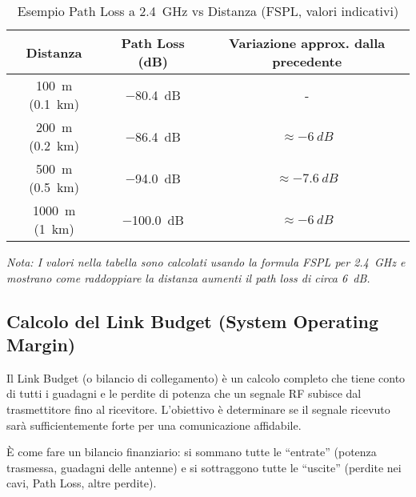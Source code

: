 \begin{table}[H]
\centering
\caption{Esempio Path Loss a \SI{2.4}{\giga\hertz} vs Distanza (FSPL, valori indicativi)}
\begin{tabular}{|c|c|c|}
\hline
\textbf{Distanza} & \textbf{Path Loss (dB)} & \textbf{Variazione approx. dalla precedente} \\ \hline
\SI{100}{\meter} (\SI{0.1}{\kilo\meter}) & \SI{-80.4}{dB} & - \\ \hline %
\SI{200}{\meter} (\SI{0.2}{\kilo\meter}) & \SI{-86.4}{dB} & $\approx \SI{-6}{dB}$ \\ \hline %
\SI{500}{\meter} (\SI{0.5}{\kilo\meter}) & \SI{-94.0}{dB} & $\approx \SI{-7.6}{dB}$ \\ \hline %
\SI{1000}{\meter} (\SI{1}{\kilo\meter}) & \SI{-100.0}{dB} & $\approx \SI{-6}{dB}$ \\ \hline %
\end{tabular}
\label{tab:path_loss_example} %
\end{table}
\textit{Nota: I valori nella tabella sono calcolati usando la formula FSPL per \SI{2.4}{\giga\hertz} e mostrano come raddoppiare la distanza aumenti il path loss di circa \SI{6}{dB}.}


\subsection{Calcolo del Link Budget (System Operating Margin)}
Il Link Budget (o bilancio di collegamento) è un calcolo completo che tiene conto di tutti i guadagni e le perdite di potenza che un segnale RF subisce dal trasmettitore fino al ricevitore. L'obiettivo è determinare se il segnale ricevuto sarà sufficientemente forte per una comunicazione affidabile.

È come fare un bilancio finanziario: si sommano tutte le ``entrate'' (potenza trasmessa, guadagni delle antenne) e si sottraggono tutte le ``uscite'' (perdite nei cavi, Path Loss, altre perdite).

